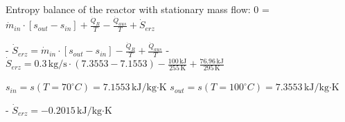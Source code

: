 Entropy balance of the reactor with stationary mass flow:  
0 = \( \dot{m}_{in} \cdot [s_{out} - s_{in}] + \frac{\dot{Q}_R}{T} - \frac{\dot{Q}_{aus}}{T} + \dot{S}_{erz} \)  

- \( \dot{S}_{erz} = \dot{m}_{in} \cdot [s_{out} - s_{in}] - \frac{\dot{Q}_R}{T} + \frac{\dot{Q}_{aus}}{T} \)  
- \( \dot{S}_{erz} = 0.3 \, \text{kg/s} \cdot (7.3553 - 7.1553) - \frac{100 \, \text{kJ}}{255 \, \text{K}} + \frac{76.96 \, \text{kJ}}{295 \, \text{K}} \)  

\( s_{in} = s(T = 70^\circ C) = 7.1553 \, \text{kJ/kg·K} \)  
\( s_{out} = s(T = 100^\circ C) = 7.3553 \, \text{kJ/kg·K} \)  

- \( \dot{S}_{erz} = -0.2015 \, \text{kJ/kg·K} \)